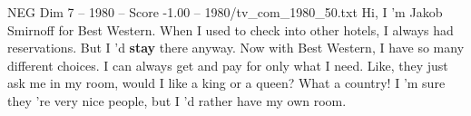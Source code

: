 \begin{textsample}{NEG Dim 7 – 1980 – Score -1.00 – 1980/tv\_com\_1980\_50.txt}  \label{ex:f7_neg_048}
Hi, I 'm Jakob Smirnoff for Best Western.
When I used to check into other hotels, I always had reservations.
But I 'd \textbf{stay} there anyway.
Now with Best Western, I have so many different choices.
I can always get and pay for only what I need.
Like, they just ask me in my room, would I like a king or a queen?
What a country!
I 'm sure they 're very nice people, but I 'd rather have my own room.

\end{textsample}
